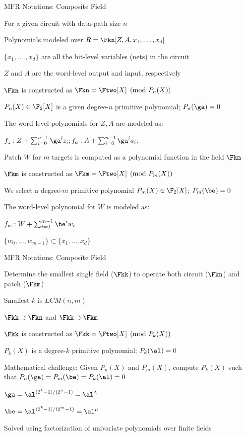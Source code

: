 \begin{frame}{\large MFR Notations: Composite Field}
\bi
	\item For a given circuit with data-path size $n$
	\bi
		\item Polynomials modeled over $R=\Fkn[Z,A,x_1,\dots,x_d]$
		\bi
			\item $\{x_1, \dots$ $, x_d\}$ are all the bit-level variables (nets) in the circuit
			\item $Z$ and $A$ are the word-level output and input, respectively
		\ei
		\item $\Fkn$ is constructed as $\Fkn = \Ftwo[X]\pmod{P_n(X)}$
		\bi
			\item $P_n(X) \in \F_2[X]$ is a given degree-$n$ primitive polynomial; $P_n(\ga) =0$ 
		\ei
		\item  The word-level polynomials for $Z,A$ are modeled as:
		\bi
			\item $f_z: Z + \sum_{i=0}^{n-1}\ga^iz_i;f_a: A + \sum_{i=0}^{n-1}\ga^ia_i;$ 
		\ei
	\ei 
	\item Patch $W$ for $m$ targets is computed as a polynomial function in the field $\Fkm$
	\bi
		\item $\Fkm$ is constructed as $\Fkm = \Ftwo[X]\pmod{P_m(X)}$
		\bi
			\item We select a degree-$m$ primitive polynomial $P_m(X)\in \F_2[X]$; $P_m(\be) =0$ 
		\ei
		\item  The word-level polynomial for $W$ is modeled as:
		\bi
			\item $f_w: W + \sum_{i=0}^{m-1}\be^iw_i$
			\item $\{w_0,\dots,w_{m-1}\} \subset \{x_1,\dots,x_d\}$
		\ei
	\ei
\ei
\end{frame}

\begin{frame}{\large MFR Notations: Composite Field}
\bi
	\item Determine the smallest single field ($\Fkk$) to operate both circuit ($\Fkn$) and patch ($\Fkm$)
	\vspace{0.1in}
	\item Smallest $k$ is $LCM(n,m)$
	\bi
		\item $\Fkk \supset \Fkn$ and $\Fkk \supset \Fkm$
		\item $\Fkk$ is constructed as $\Fkk = \Ftwo[X]\pmod{P_k(X)}$
		\bi
			\item $P_k(X)$ is a degree-$k$ primitive polynomial; $P_k(\al) =0$ 
		\ei
	\ei
	\vspace{0.1in}
	\item  Mathematical challenge: Given $P_n(X)$ and $P_m(X)$, compute $P_k(X)$ such that
	$P_n(\ga)= P_m(\be)=P_k(\al)=0$
	\vspace{0.1in}
	\bi
		\item $\ga = \al^{(2^k-1)/(2^n-1)} = \al^{\lambda}$
		\item $\be = \al^{(2^k-1)/(2^m-1)} = \al^{\mu}$
	\ei
	\vspace{0.1in}
	\item Solved using factorization of univariate polynomials over finite fields
\ei

\end{frame}

